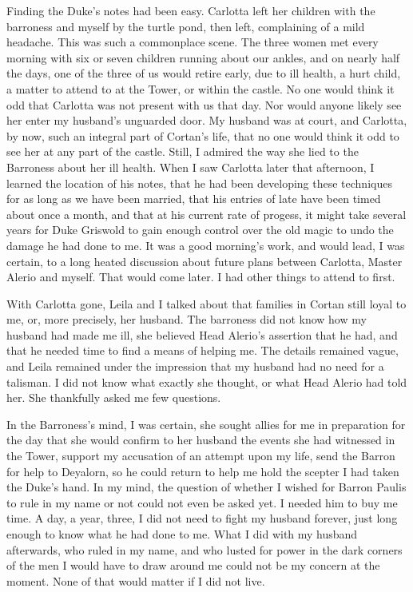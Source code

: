\documentclass{article}
\begin{document}
Finding the Duke's notes had been easy. Carlotta left her children with the barroness and myself by the turtle pond, then left, complaining of a mild headache. This was such a commonplace scene. The three women met every morning with six or seven children running about our ankles, and on nearly half the days, one of the three of us would retire early, due to ill health, a hurt child, a matter to attend to at the Tower, or within the castle. No one would think it odd that Carlotta was not present with us that day. Nor would anyone likely see her enter my husband's unguarded door. My husband was at court, and Carlotta, by now, such an integral part of Cortan's life, that no one would think it odd to see her at any part of the castle. Still, I admired the way she lied to the Barroness about her ill health. When I saw Carlotta later that afternoon, I learned the location of his notes, that he had been developing these techniques for as long as we have been married, that his entries of late have been timed about once a month, and that at his current rate of progess, it might take several years for Duke Griswold to gain enough control over the old magic to undo the damage he had done to me. It was a good morning's work, and would lead, I was certain, to a long heated discussion about future plans between Carlotta, Master Alerio and myself. That would come later. I had other things to attend to first. 

With Carlotta gone, Leila and I talked about that families in Cortan still loyal to me, or, more precisely, her husband. The barroness did not know how my husband had made me ill, she believed Head Alerio's assertion that he had, and that he needed time to find a means of helping me. The details remained vague, and Leila remained under the impression that my husband had no need for a talisman. I did not know what exactly she thought, or what Head Alerio had told her. She thankfully asked me few questions. 

In the Barroness's mind, I was certain, she sought allies for me in preparation for the day that she would confirm to her husband the events she had witnessed in the Tower, support my accusation of an attempt upon my life, send the Barron for help to Deyalorn, so he could return to help me hold the scepter I had taken the Duke's hand. In my mind, the question of whether I wished for Barron Paulis to rule in my name or not could not even be asked yet. I needed him to buy me time. A day, a year, three, I did not need to fight my husband forever, just long enough to know what he had done to me. What I did with my husband afterwards, who ruled in my name, and who lusted for power in the dark corners of the men I would have to draw around me could not be my concern at the moment. None of that would matter if I did not live.
\end{document}
